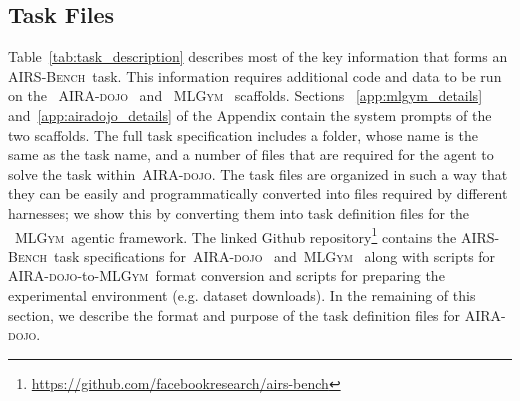 \documentclass{fairmeta}
\newcommand{\airsbench}{\textsc{AIRS-Bench}}
\newcommand{\airadojo}{\textsc{AIRA-dojo}}
\newcommand{\mlgym}{\textsc{MLGym}}
\begin{document}


\subsection{Task  Files}
Table~\ref{tab:task_description} describes most of the key information that forms an \airsbench~task. This information requires additional code and data to be run on the ~\airadojo~ and ~\mlgym~ scaffolds. Sections ~\ref{app:mlgym_details} and~\ref{app:airadojo_details} of the Appendix contain the system prompts of the two scaffolds. The full task specification includes a folder, whose name is the same as the task name, and a number of files that are required for the agent to solve the task within~\airadojo. The task files are organized in such a way that they can be easily and programmatically converted into files required by different harnesses; we show this by converting them into task definition files for the ~\mlgym~agentic framework.  The linked Github repository\footnote{\url{https://github.com/facebookresearch/airs-bench}} contains the \airsbench~task specifications for~\airadojo~ and~\mlgym~ along with scripts for \airadojo-to-\mlgym~format conversion and scripts for preparing the experimental environment (e.g. dataset downloads). In the remaining of this section, we describe the format and purpose of the task definition files for \airadojo.
\end{document}
